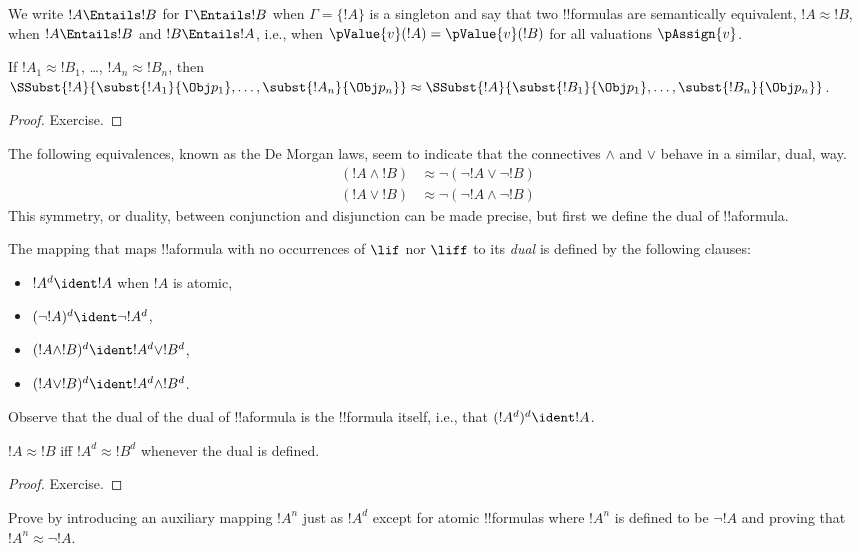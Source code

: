 \documentclass[../../../include/open-logic-section]{subfiles}
\begin{document}
We write $!A \Entails !B$ for $\Gamma \Entails !B$ when $\Gamma = \{!A\}$ is a singleton and say that two !!{formula}s are semantically equivalent, $!A \approx !B$, when $!A \Entails !B$ and $!B \Entails !A$, i.e., when $\pValue{v}(!A) = \pValue{v}(!B)$ for all valuations $\pAssign{v}$.

\begin{prop}
  If \( !A_1 \approx !B_1 \), \dots, \( !A_n \approx !B_n \), then \( \SSubst{!A}{\subst{!A_1}{\Obj p_1},\dots,\subst{!A_n}{\Obj p_n}} \approx \SSubst{!A}{\subst{!B_1}{\Obj p_1},\dots,\subst{!B_n}{\Obj p_n}} \).
\end{prop}

\begin{proof}
  Exercise.
\end{proof}

The following equivalences, known as the De Morgan laws, seem to indicate that the connectives $\land$ and $\lor$ behave in a similar, dual, way. 
  \begin{align*}
    ({!A} \land {!B}) &\approx \lnot(\lnot{!A} \lor \lnot{!B})\\
    ({!A} \lor {!B}) &\approx \lnot(\lnot{!A} \land \lnot{!B})
  \end{align*}
This symmetry, or duality, between conjunction and disjunction can be made precise, but first we define the dual of !!a{formula}.

\begin{defn}
The mapping that maps !!a{formula} with no occurrences of $\lif$ nor $\liff$ to its \emph{dual} is defined by the following clauses:
\begin{itemize}
  \item $!A^d \ident !A$ when $!A$ is atomic,
  \item $(\lnot !A )^d \ident \lnot !A^d$,
  \item $(!A \land !B)^d \ident !A^d \lor !B^d$,
  \item $(!A \lor !B)^d \ident !A^d \land !B^d$.
\end{itemize}
\end{defn}

Observe that the dual of the dual of !!a{formula} is the !!{formula} itself, i.e., that $(!A^d)^d \ident !A$.

\begin{prop}
$!A \approx !B$ iff $!A^d \approx !B^d$ whenever the dual is defined.
\end{prop}
\begin{proof}
Exercise.
\end{proof}

\begin{prob}
Prove  by introducing an auxiliary mapping $!A^n$ just as $!A^d$ except for atomic !!{formula}s where $!A^n$ is defined to be $\lnot !A$ and proving that $!A^n \approx \lnot !A$.
\end{prob}
\end{document}
